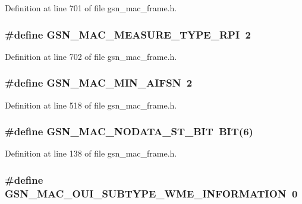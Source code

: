Definition at line 701 of file gsn\_\-mac\_\-frame.h.

\hypertarget{a00523_a7972a28ee343a6c0b157ce8080d27d5c}{
\subsubsection[{GSN\_\-MAC\_\-MEASURE\_\-TYPE\_\-RPI}]{\setlength{\rightskip}{0pt plus 5cm}\#define GSN\_\-MAC\_\-MEASURE\_\-TYPE\_\-RPI~2}}
\label{a00523_a7972a28ee343a6c0b157ce8080d27d5c}


Definition at line 702 of file gsn\_\-mac\_\-frame.h.

\hypertarget{a00523_aa45c6a564699d30eb1af3fb2d4198c31}{
\subsubsection[{GSN\_\-MAC\_\-MIN\_\-AIFSN}]{\setlength{\rightskip}{0pt plus 5cm}\#define GSN\_\-MAC\_\-MIN\_\-AIFSN~2}}
\label{a00523_aa45c6a564699d30eb1af3fb2d4198c31}


Definition at line 518 of file gsn\_\-mac\_\-frame.h.

\hypertarget{a00523_ab8865bbea13c1a7978979d1c2fbbbc88}{
\subsubsection[{GSN\_\-MAC\_\-NODATA\_\-ST\_\-BIT}]{\setlength{\rightskip}{0pt plus 5cm}\#define GSN\_\-MAC\_\-NODATA\_\-ST\_\-BIT~BIT(6)}}
\label{a00523_ab8865bbea13c1a7978979d1c2fbbbc88}


Definition at line 138 of file gsn\_\-mac\_\-frame.h.

\hypertarget{a00523_ac90483af09dd5d1d9bce83e8c4891fff}{
\subsubsection[{GSN\_\-MAC\_\-OUI\_\-SUBTYPE\_\-WME\_\-INFORMATION}]{\setlength{\rightskip}{0pt plus 5cm}\#define GSN\_\-MAC\_\-OUI\_\-SUBTYPE\_\-WME\_\-INFORMATION~0}}
\label{a00523_ac90483af09dd5d1d9bce83e8c4891fff}


